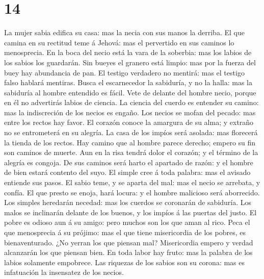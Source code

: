 \hypertarget{section-20-14}{%
\section{14}\label{section-20-14}}

 La mujer sabia edifica su casa: mas la necia con sus
manos la derriba.  El que camina en su rectitud teme á
Jehová: mas el pervertido en sus caminos lo menosprecia. 
En la boca del necio está la vara de la soberbia: mas los labios de los
sabios los guardarán.  Sin bueyes el granero está limpio:
mas por la fuerza del buey hay abundancia de pan.  El
testigo verdadero no mentirá: mas el testigo falso hablará mentiras.
 Busca el escarnecedor la sabiduría, y no la halla: mas la
sabiduría al hombre entendido es fácil.  Vete de delante
del hombre necio, porque en él no advertirás labios de ciencia.
 La ciencia del cuerdo es entender su camino: mas la
indiscreción de los necios es engaño.  Los necios se mofan
del pecado: mas entre los rectos hay favor.  El corazón
conoce la amargura de su alma; y extraño no se entrometerá en su
alegría.  La casa de los impíos será asolada: mas
florecerá la tienda de los rectos.  Hay camino que al
hombre parece derecho; empero su fin son caminos de muerte.
 Aun en la risa tendrá dolor el corazón; y el término de
la alegría es congoja.  De sus caminos será harto el
apartado de razón: y el hombre de bien estará contento del suyo.
 El simple cree á toda palabra: mas el avisado entiende
sus pasos.  El sabio teme, y se aparta del mal: mas el
necio se arrebata, y confía.  El que presto se enoja,
hará locura: y el hombre malicioso será aborrecido.  Los
simples heredarán necedad: mas los cuerdos se coronarán de sabiduría.
 Los malos se inclinarán delante de los buenos, y los
impíos á las puertas del justo.  El pobre es odioso aun á
su amigo: pero muchos son los que aman al rico.  Peca el
que menosprecia á su prójimo: mas el que tiene misericordia de los
pobres, es bienaventurado.  ¿No yerran los que piensan
mal? Misericordia empero y verdad alcanzarán los que piensan bien.
 En toda labor hay fruto: mas la palabra de los labios
solamente empobrece.  Las riquezas de los sabios son su
corona: mas es infatuación la insensatez de los necios. 
